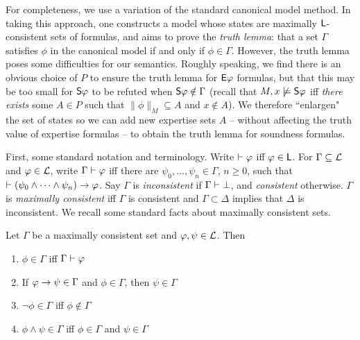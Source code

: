 For completeness, we use a variation of the standard canonical model method.
In taking this approach, one constructs a model whose states are maximally
$\sL$-consistent sets of formulas, and aims to prove the \emph{truth lemma}:
that a set $\Gamma$ satisfies $\phi$ in the canonical model if and only if
$\phi \in \Gamma$. However, the truth lemma poses some difficulties for our
semantics. Roughly speaking, we find there is an obvious choice of $P$ to
ensure the truth lemma for $\E\phi$ formulas, but that this may be too small
for $\S\phi$ to be refuted when $\S\phi \notin \Gamma$ (recall that $M, x
\not\models \S\phi$ iff \emph{there exists} some $A \in P$ such that
$\|\phi\|_M \subseteq A$ and $x \notin A$). We therefore ``enlargen" the set of
states so we can add new expertise sets $A$ -- without affecting the truth
value of expertise formulas -- to obtain the truth lemma for soundness
formulas.

First, some standard notation and terminology. Write $\thm \phi$ iff
$\phi \in \sL$. For $\Gamma \subseteq \cL$ and $\phi \in \cL$, write $\Gamma
\thm \phi$ iff there are $\psi_0, \ldots, \psi_n \in \Gamma$, $n \ge 0$, such
that $\thm (\psi_0 \land \cdots \land \psi_n) \limplies \phi$.  Say $\Gamma$
is \emph{inconsistent} if $\Gamma \entails \bot$, and
\emph{consistent} otherwise. $\Gamma$ is \emph{maximally
consistent} iff $\Gamma$ is consistent and $\Gamma \subset \Delta$ implies that
$\Delta$ is inconsistent. We recall some standard facts about maximally
consistent sets.

\begin{lemma}
\label{lemma_mcs_facts}
    Let $\Gamma$ be a maximally consistent set and $\phi, \psi \in \cL$. Then
    \begin{enumerate}\small
        \item\label{item_mcs_mem_entail} $\phi \in \Gamma$ iff $\Gamma \entails
            \phi$

        \item\label{item_mcs_modpon} If $\phi \limplies \psi \in \Gamma$ and
            $\phi \in \Gamma$, then $\psi \in \Gamma$

        \item\label{item_mcs_negations} $\neg\phi \in \Gamma$ iff $\phi \notin
            \Gamma$

        \item\label{item_mcs_conjunctions} $\phi \land \psi \in \Gamma$ iff
            $\phi \in \Gamma$ and $\psi \in \Gamma$
    \end{enumerate}
\end{lemma}

